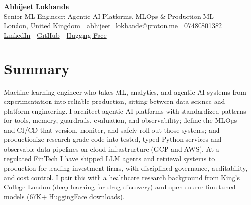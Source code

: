 \documentclass[10pt,a4paper]{article}
\newcommand{\sep}{\,\textcolor{accent!60}{\textbar}\,}
\begin{document}
\begin{center}
  {\fontsize{24}{26}\selectfont\bfseries Abhijeet Lokhande}\\[3pt]
  {\color{accent}\large Senior ML Engineer: Agentic AI Platforms, MLOps \& Production ML}\\[5pt]
  {\small
    London, United Kingdom \sep
    \href{mailto:abhijeet_lokhande@proton.me}{abhijeet\_lokhande@proton.me} \sep
    07480801382 \\[2pt]
    \href{https://www.linkedin.com/in/ablds/}{LinkedIn} \sep
    \href{https://github.com/abhijeetscode}{GitHub} \sep
    \href{https://huggingface.co/ab-ai}{Hugging Face}
  }
\end{center}
\vspace{2pt}

\section{Summary}
Machine learning engineer who takes ML, analytics, and agentic AI systems from experimentation into reliable production, sitting between data science and platform engineering. I architect agentic AI platforms with standardized patterns for tools, memory, guardrails, evaluation, and observability; define the MLOps and CI/CD that version, monitor, and safely roll out those systems; and productionize research-grade code into tested, typed Python services and observable data pipelines on cloud infrastructure (GCP and AWS). At a regulated FinTech I have shipped LLM agents and retrieval systems to production for leading investment firms, with disciplined governance, auditability, and cost control. I pair this with a healthcare research background from King's College London (deep learning for drug discovery) and open-source fine-tuned models (67K+ HuggingFace downloads).

\end{document}
